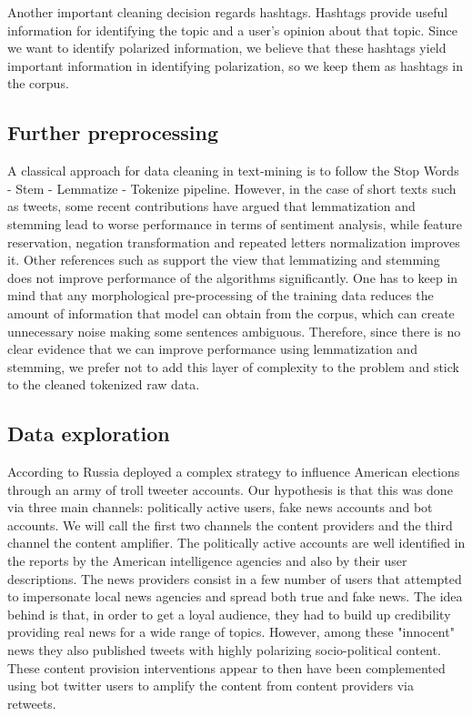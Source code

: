 \documentclass[12pt, authoryear]{elsarticle}
\begin{document}
Another important cleaning decision regards hashtags. Hashtags provide useful information for identifying the topic and a user's opinion about that topic. Since we want to identify polarized information, we believe that these hashtags yield important information in identifying polarization, so we keep them as hashtags in the corpus.

\subsection{Further preprocessing}

A classical approach for data cleaning in text-mining is to follow the Stop Words - Stem - Lemmatize - Tokenize pipeline. However, in the case of short texts such as tweets, some recent contributions \cite{preprocessing} have argued that lemmatization and stemming lead to worse performance in terms of sentiment analysis, while feature reservation, negation transformation and repeated letters normalization improves it. Other references such as \cite{Hollink2004} support the view that lemmatizing and stemming does not improve performance of the algorithms significantly. One has to keep in mind that any morphological pre-processing of the training data reduces the amount of information that model can obtain from the corpus, which can create unnecessary noise making some sentences ambiguous. Therefore, since there is no clear evidence that we can improve performance using lemmatization and stemming, we prefer not to add this layer of complexity to the problem and stick to the cleaned tokenized raw data.

\subsection{Data exploration}

According to \cite{mueller2019report} Russia deployed a complex strategy to influence American elections through an army of troll tweeter accounts. Our hypothesis is that this was done via three main channels: politically active users, fake news accounts and bot accounts. We will call the first two channels the content providers and the third channel the content amplifier. The politically active accounts are well identified in the reports by the American intelligence agencies and also by their user descriptions. The news providers consist in a few number of users that attempted to impersonate local news agencies and spread both true and fake news. The idea behind is that, in order to get a loyal audience, they had to build up credibility providing real news for a wide range of topics. However, among these "innocent" news they also published tweets with highly polarizing socio-political content. These content provision interventions appear to then have been complemented using bot twitter users to amplify the content from content providers via retweets.
\end{document}
